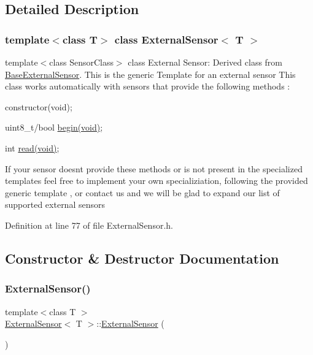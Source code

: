 \subsection{Detailed Description}
\subsubsection*{template$<$class T$>$\newline
class External\+Sensor$<$ T $>$}

template$<$class Sensor\+Class$>$ class External Sensor\+: Derived class from \hyperlink{class_base_external_sensor}{Base\+External\+Sensor}. This is the generic Template for an external sensor This class works automatically with sensors that provide the following methods \+:
\begin{DoxyItemize}
\item constructor(void);
\item uint8\+\_\+t/bool \hyperlink{class_external_sensor_ab6fe1379d55b656a048e0fba1e0a32e6}{begin(void)};
\item int \hyperlink{class_external_sensor_a6dbf2d6b1c183740ce0f153d6e43ccb2}{read(void)};
\end{DoxyItemize}

If your sensor doesn\textquotesingle{}t provide these methods or is not present in the specialized templates feel free to implement your own specializiation, following the provided generic template , or contact us and we will be glad to expand our list of supported external sensors 

Definition at line 77 of file External\+Sensor.\+h.



\subsection{Constructor \& Destructor Documentation}
\mbox{\label{class_external_sensor_a8b991447fba33253103d06198b838751}} 
\subsubsection{\texorpdfstring{External\+Sensor()}{ExternalSensor()}}
{\footnotesize\ttfamily template$<$class T $>$ \\
\hyperlink{class_external_sensor}{External\+Sensor}$<$ T $>$\+::\hyperlink{class_external_sensor}{External\+Sensor} (\begin{DoxyParamCaption}{ }\end{DoxyParamCaption})\hspace{0.3cm}{\ttfamily [inline]}}

